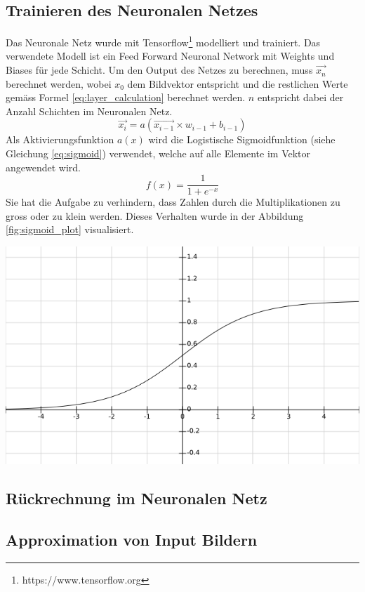\documentclass[Interploate_hadwritten_Digits.tex.tex]{subfiles}
\begin{document}
	\subsection{Trainieren des Neuronalen Netzes}
	Das Neuronale Netz wurde mit Tensorflow\footnote{https://www.tensorflow.org} modelliert und trainiert. Das verwendete Modell ist ein Feed Forward Neuronal Network mit Weights und Biases für jede Schicht. Um den Output des Netzes zu berechnen, muss $ \vec{x_{n}} $ berechnet werden, wobei $ x_{0} $ dem Bildvektor entspricht und die restlichen Werte gemäss Formel \ref{eq:layer_calculation} berechnet werden. $ n $ entspricht dabei der Anzahl Schichten im Neuronalen Netz.
	\begin{equation}
	\vec{x_{i}} = a(\vec{x_{i-1}} \times w_{i-1} + b_{i-1})
	\label{eq:layer_calculation}
	\end{equation}
	Als Aktivierungsfunktion $ a(x) $ wird die Logistische Sigmoidfunktion (siehe Gleichung \ref{eq:sigmoid}) verwendet, welche auf alle Elemente im Vektor angewendet wird. 
	\begin{equation}
	f(x)=\frac{1}{1+e^{-x}}
	\label{eq:sigmoid}
	\end{equation}
	Sie hat die Aufgabe zu verhindern, dass Zahlen durch die Multiplikationen zu gross oder zu klein werden. Dieses Verhalten wurde in der Abbildung \ref{fig:sigmoid_plot} visualisiert.
	\begin{Figure}
		\centering
		\includegraphics[width=\linewidth]{img/sigmoid_plot.png}
		\label{fig:sigmoid_plot}
	\end{Figure}
	
	\subsection{Rückrechnung im Neuronalen Netz}
	
	\subsection{Approximation von Input Bildern}
	
\end{document}

